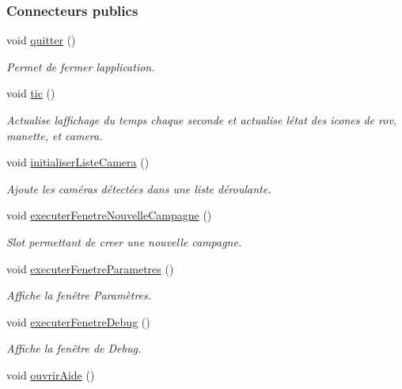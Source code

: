 \subsubsection*{Connecteurs publics}
\begin{DoxyCompactItemize}
\item 
void \hyperlink{class_i_h_m_rov_a6446087033d8ead72d16451b4a29c44e}{quitter} ()
\begin{DoxyCompactList}\small\item\em Permet de fermer l\textquotesingle{}application. \end{DoxyCompactList}\item 
void \hyperlink{class_i_h_m_rov_a4a0d3a0741d0669ede732b630eae54c6}{tic} ()
\begin{DoxyCompactList}\small\item\em Actualise l\textquotesingle{}affichage du temps chaque seconde et actualise l\textquotesingle{}état des icones de rov, manette, et camera. \end{DoxyCompactList}\item 
void \hyperlink{class_i_h_m_rov_af3e46f174ab2fdeaebb2d00e6b8bcb33}{initialiser\+Liste\+Camera} ()
\begin{DoxyCompactList}\small\item\em Ajoute les caméras détectées dans une liste déroulante. \end{DoxyCompactList}\item 
void \hyperlink{class_i_h_m_rov_a3169e8cd9132ece69af974648066c6c1}{executer\+Fenetre\+Nouvelle\+Campagne} ()
\begin{DoxyCompactList}\small\item\em Slot permettant de creer une nouvelle campagne. \end{DoxyCompactList}\item 
void \hyperlink{class_i_h_m_rov_a2ec97de9b75c073c6a4dd0792a284002}{executer\+Fenetre\+Parametres} ()
\begin{DoxyCompactList}\small\item\em Affiche la fenêtre Paramètres. \end{DoxyCompactList}\item 
void \hyperlink{class_i_h_m_rov_a8931cade7a1613975da7174b5c2e84d2}{executer\+Fenetre\+Debug} ()
\begin{DoxyCompactList}\small\item\em Affiche la fenêtre de Debug. \end{DoxyCompactList}\item 
void \hyperlink{class_i_h_m_rov_a45a10161fde8c6373918ec30f16a8b5e}{ouvrir\+Aide} ()

\end{DoxyCompactItemize}
